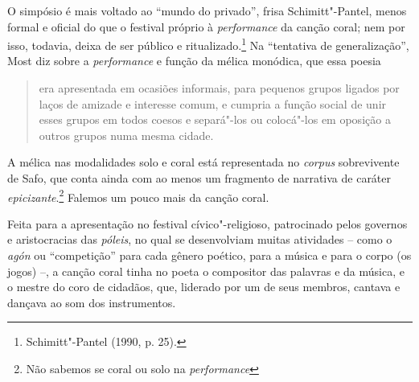 O simpósio é mais voltado ao “mundo do privado”, frisa Schimitt"-Pantel, menos
formal e oficial do que o festival próprio à \textit{performance}
da canção coral; nem por isso, todavia, deixa de ser público e
ritualizado.\footnote{ Schimitt"-Pantel (1990, p. 25).} Na
“tentativa de generalização”, Most diz sobre a \textit{performance} e função da
mélica monódica, que essa poesia 

\begin{quote}
era apresentada em ocasiões informais, para
pequenos grupos ligados por laços de amizade e interesse comum, e cumpria a
função social de unir esses grupos em todos coesos e separá"-los ou colocá"-los
em oposição a outros grupos numa mesma cidade.
\end{quote}

A mélica nas modalidades solo e coral está representada no \textit{corpus} sobrevivente
de Safo, que conta ainda com ao menos um fragmento de narrativa de
caráter \textit{epicizante}.\footnote{Não sabemos se coral ou solo na \textit{performance}} 
Falemos um pouco mais da canção coral.

Feita para a apresentação no festival cívico"-religioso, patrocinado
pelos governos e aristocracias das \textit{póleis}, no qual se
desenvolviam muitas atividades -- como o \textit{agón} ou ``competição'' 
para cada gênero poético, para a música e para o corpo (os jogos) \mbox{--,} a canção coral tinha no poeta o compositor das palavras e
da música, e o mestre do coro de cidadãos, que, liderado por um de seus
membros, cantava e dançava ao som dos instrumentos.


